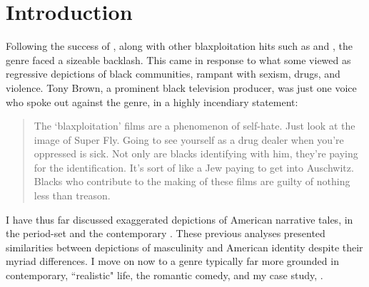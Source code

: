 





\section{Introduction}

Following the success of \textcite{parks_super_1972}, along with other blaxploitation hits such as \textcite{parks_shaft_1971} and \textcite{van_peebles_sweet_1971}, the genre faced a sizeable backlash.
This came in response to what some viewed as regressive depictions of black communities, rampant with sexism, drugs, and violence.
Tony Brown, a prominent black television producer, was just one voice who spoke out against the genre, in a highly incendiary statement:
\begin{quote}
The `blaxploitation’ films are a phenomenon of self-hate. Just look at the image of Super Fly. Going to see yourself as a drug dealer when you’re oppressed is sick. Not only are blacks identifying with him, they’re paying for the identification. It’s sort of like a Jew paying to get into Auschwitz. Blacks who contribute to the making of these films are guilty of nothing less than treason.\autocite[Tony Brown, quoted in][102]{donnelly_african_2025}
\end{quote}
I have thus far discussed exaggerated depictions of American narrative tales, in the period-set \textcite{sherman_big_1971} and the contemporary \textcite{parks_super_1972}.
These previous analyses presented similarities between depictions of masculinity and American identity despite their myriad differences.
I move on now to a genre typically far more grounded in contemporary, ``realistic" life, the romantic comedy, and my case study, \textcite{berry_claudine_1974}.



